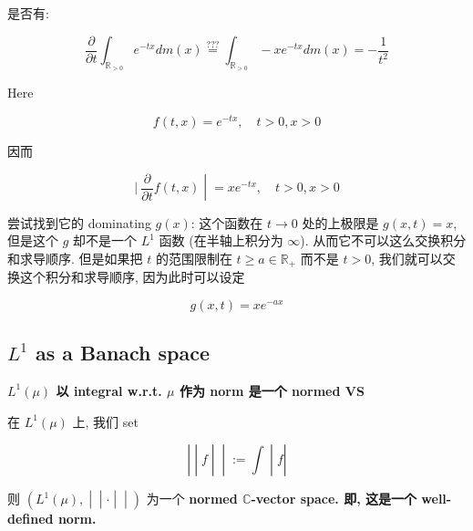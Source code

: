 \documentclass{qlnotes-export}
\begin{document}
\begin{example}

是否有:

\[\frac{\partial}{\partial t}\int_{{\mathbb{R}}_{> 0}}e^{- tx} dm(x)\overset{???}{=}\int_{{\mathbb{R}}_{> 0}} - xe^{- tx} dm(x) = - \frac{1}{t^{2}}\]

Here

\[f(t,x) = e^{- tx},\quad t > 0,x > 0\]

因而

\[\left. |\ \frac{\partial}{\partial t}f(t,x) \middle| = xe^{- tx},\quad t > 0,x > 0 \right.\]

尝试找到它的 dominating \(g(x)\): 这个函数在 \(t\rightarrow 0\) 处的上极限是 \(g(x,t) = x\), 但是这个 \(g\) 却不是一个 \(L^{1}\) 函数 (在半轴上积分为 \(\infty\)). 从而它不可以这么交换积分和求导顺序. 但是如果把 \(t\) 的范围限制在 \(t \geq a \in {\mathbb{R}}_{+}\) 而不是 \(t > 0\), 我们就可以交换这个积分和求导顺序, 因为此时可以设定

\[g(x,t) = xe^{- ax}\]

\end{example}

\subsection{\texorpdfstring{\(L^{1}\) as a Banach space}{L\^{}\{1\} as a Banach space}}\label{l1-as-a-banach-space}

\begin{theorem}{\protect{}\label{kn-l-1-mu-integral-w-r-t-mu-norm-normed-vs}{\textbf{\(L^{1}(\mu)\)
以 integral w.r.t. \(\mu\) 作为 norm 是一个 normed VS}}}

在 \(L^{1}(\mu)\) 上, 我们 set

\[\left. | \middle| f \middle| \middle| := \int \middle| f| \right.\]

则 \(\left. (L^{1}(\mu), \middle| \middle| \cdot \middle| \middle| ) \right.\) 为一个 \textbf{normed \(\mathbb{C}\)-vector space. 即, 这是一个 well-defined norm.}

\end{theorem}
\end{document}
